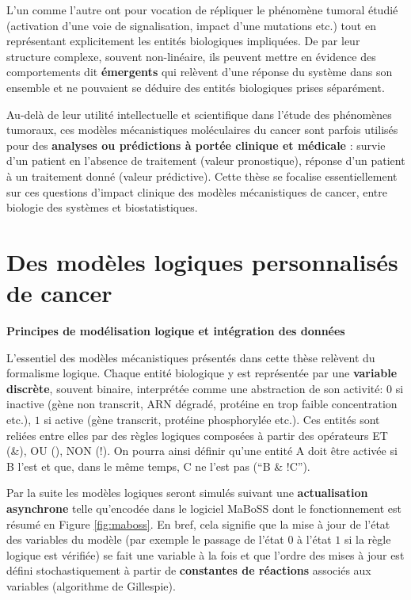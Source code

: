 \documentclass[a4paper,12pt,twoside,onecolumn,openright,final,oldfontcommands]{memoir}
\begin{document}
L'un comme l'autre ont pour vocation de répliquer le phénomène tumoral
étudié (activation d'une voie de signalisation, impact d'une mutations
etc.) tout en représentant explicitement les entités biologiques
impliquées. De par leur structure complexe, souvent non-linéaire, ils
peuvent mettre en évidence des comportements dit \textbf{émergents} qui
relèvent d'une réponse du système dans son ensemble et ne pouvaient se
déduire des entités biologiques prises séparément.

Au-delà de leur utilité intellectuelle et scientifique dans l'étude des
phénomènes tumoraux, ces modèles mécanistiques moléculaires du cancer
sont parfois utilisés pour des \textbf{analyses ou prédictions à portée
clinique et médicale} : survie d'un patient en l'absence de traitement
(valeur pronostique), réponse d'un patient à un traitement donné (valeur
prédictive). Cette thèse se focalise essentiellement sur ces questions
d'impact clinique des modèles mécanistiques de cancer, entre biologie
des systèmes et biostatistiques.

\section{Des modèles logiques personnalisés de
cancer}\label{des-moduxe8les-logiques-personnalisuxe9s-de-cancer}

\textbf{Principes de modélisation logique et intégration des données}

L'essentiel des modèles mécanistiques présentés dans cette thèse
relèvent du formalisme logique. Chaque entité biologique y est
représentée par une \textbf{variable discrète}, souvent binaire,
interprétée comme une abstraction de son activité: \(0\) si inactive
(gène non transcrit, ARN dégradé, protéine en trop faible concentration
etc.), \(1\) si active (gène transcrit, protéine phosphorylée etc.). Ces
entités sont reliées entre elles par des règles logiques composées à
partir des opérateurs ET (\&), OU (\textbar{}), NON (!). On pourra ainsi
définir qu'une entité A doit être activée si B l'est et que, dans le
même temps, C ne l'est pas (``B \& !C'').

Par la suite les modèles logiques seront simulés suivant une
\textbf{actualisation asynchrone} telle qu'encodée dans le logiciel
MaBoSS dont le fonctionnement est résumé en Figure \ref{fig:maboss}. En
bref, cela signifie que la mise à jour de l'état des variables du modèle
(par exemple le passage de l'état \(0\) à l'état \(1\) si la règle
logique est vérifiée) se fait une variable à la fois et que l'ordre des
mises à jour est défini stochastiquement à partir de \textbf{constantes
de réactions} associés aux variables (algorithme de Gillespie).
\end{document}
